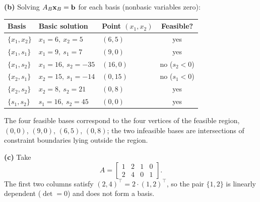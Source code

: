 \textbf{(b)} Solving $A_B \mathbf{x}_B = \mathbf{b}$ for each basis (nonbasic variables
zero):
\begin{center}
\begin{tabular}{l|l|l|c}
Basis & Basic solution & Point $(x_1, x_2)$ & Feasible? \\
\hline
$\{x_1, x_2\}$ & $x_1 = 6,\ x_2 = 5$ & $(6, 5)$ & yes \\
$\{x_1, s_1\}$ & $x_1 = 9,\ s_1 = 7$ & $(9, 0)$ & yes \\
$\{x_1, s_2\}$ & $x_1 = 16,\ s_2 = -35$ & $(16, 0)$ & no ($s_2 < 0$) \\
$\{x_2, s_1\}$ & $x_2 = 15,\ s_1 = -14$ & $(0, 15)$ & no ($s_1 < 0$) \\
$\{x_2, s_2\}$ & $x_2 = 8,\ s_2 = 21$ & $(0, 8)$ & yes \\
$\{s_1, s_2\}$ & $s_1 = 16,\ s_2 = 45$ & $(0, 0)$ & yes \\
\end{tabular}
\end{center}
The four feasible bases correspond to the four vertices of the feasible
region, $(0,0)$, $(9,0)$, $(6,5)$, $(0,8)$; the two infeasible bases are
intersections of constraint boundaries lying outside the region.

\textbf{(c)} Take
\[
A = \begin{bmatrix} 1 & 2 & 1 & 0 \\ 2 & 4 & 0 & 1 \end{bmatrix}.
\]
The first two columns satisfy $(2, 4)^\top = 2 \cdot (1, 2)^\top$, so
the pair $\{1, 2\}$ is linearly dependent ($\det = 0$) and does not form
a basis.


